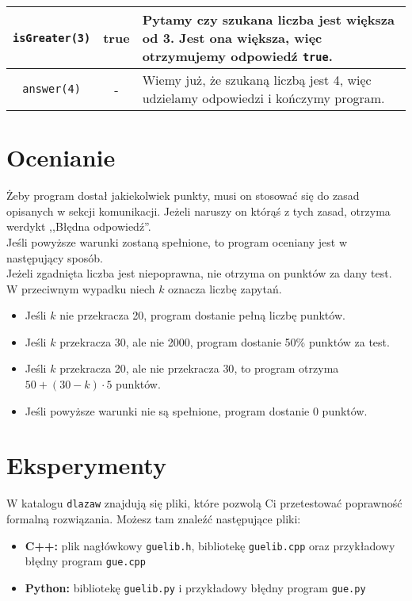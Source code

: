 \documentclass[zad,zawodnik,utf8]{sinol}
\begin{document}
\begin{tasktext}
\begin{tabular}{|c|c|p{12.5cm}|}
        \texttt{isGreater(3)} & true &
        Pytamy czy szukana liczba jest większa od 3.
        Jest ona większa, więc otrzymujemy odpowiedź \texttt{true}. 
        \\ \hline

        \texttt{answer(4)} & - &
        Wiemy już, że szukaną liczbą jest 4,
        więc udzielamy odpowiedzi i kończymy program.
        \\ \hline
    \end{tabular}

\section{Ocenianie}
    Żeby program dostał jakiekolwiek punkty,
    musi on stosować się do zasad opisanych w sekcji komunikacji.
    Jeżeli naruszy on którąś z tych zasad, otrzyma werdykt ,,Błędna odpowiedź''.\\
    Jeśli powyższe warunki zostaną spełnione,
    to program oceniany jest w następujący sposób.\\
    Jeżeli zgadnięta liczba jest niepoprawna,
    nie otrzyma on punktów za dany test.\\
    W przeciwnym wypadku niech $k$ oznacza liczbę zapytań.
    \begin{itemize}
        \item Jeśli $k$ nie przekracza 20, program dostanie pełną liczbę punktów.
        \item Jeśli $k$ przekracza 30, ale nie 2000,
            program dostanie 50\% punktów za test.
        \item Jeśli $k$ przekracza 20, ale nie przekracza $30$, to program otrzyma
            $50 + (30 - k) \cdot 5$ punktów.
        \item Jeśli powyższe warunki nie są spełnione, program dostanie 0 punktów.
    \end{itemize}

\section{Eksperymenty}
    W katalogu \texttt{dlazaw} znajdują się pliki,
    które pozwolą Ci przetestować poprawność formalną rozwiązania.
    Możesz tam znaleźć następujące pliki:
    \begin{itemize}
        \item \textbf{C++:} plik nagłówkowy \texttt{guelib.h},
            bibliotekę \texttt{guelib.cpp}
            oraz przykładowy błędny program \texttt{gue.cpp}
        \item \textbf{Python:} bibliotekę \texttt{guelib.py}
            i przykładowy błędny program \texttt{gue.py}
    \end{itemize}
    

\end{tasktext}
\end{document}
